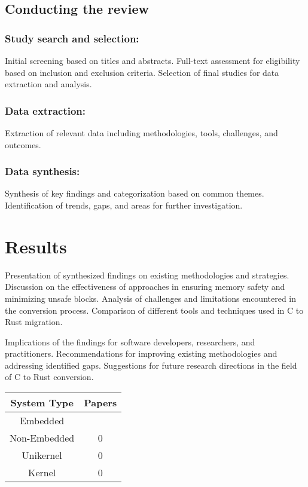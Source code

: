 \documentclass[sigconf]{acmart}
\begin{document}
\subsection{Conducting the review}

\subsubsection{Study search and selection:}

Initial screening based on titles and abstracts.  Full-text assessment for eligibility based on
inclusion and exclusion criteria.  Selection of final studies for data extraction and analysis.

\subsubsection{Data extraction:}

Extraction of relevant data including methodologies, tools, challenges, and outcomes.

\subsubsection{Data synthesis:}

Synthesis of key findings and categorization based on common themes.
Identification of trends, gaps, and areas for further investigation.

\section{Results}

Presentation of synthesized findings on existing methodologies and strategies.  Discussion on the
effectiveness of approaches in ensuring memory safety and minimizing unsafe blocks.  Analysis of
challenges and limitations encountered in the conversion process.  Comparison of different tools and
techniques used in C to Rust migration.

Implications of the findings for software developers, researchers, and practitioners.
Recommendations for improving existing methodologies and addressing identified gaps.
Suggestions for future research directions in the field of C to Rust conversion.

\begin{table}
  \begin{tabular}{||c|c||}
    \hline
    System Type & Papers\\
    \hline\hline
    Embedded & ~\cite{Ayers2022-vk} \\
    Non-Embedded & 0 \\
    Unikernel & 0 \\
    Kernel & 0 \\
    \hline
  \end{tabular}
\end{table}
\end{document}
